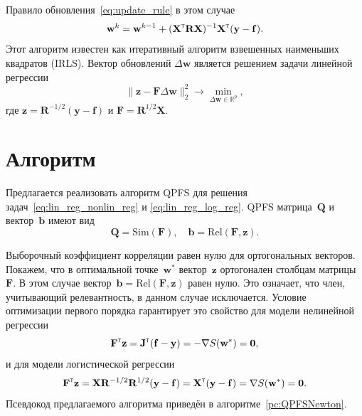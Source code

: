 \documentclass[a4paper,12pt]{article}
\theoremstyle{plain} %
\theoremstyle{definition} %
\theoremstyle{remark} %
\newcommand{\bb}{\mathbf{b}}
\newcommand{\bw}{\mathbf{w}}
\newcommand{\by}{\mathbf{y}}
\newcommand{\bz}{\mathbf{z}}
\newcommand{\bJ}{\mathbf{J}}
\newcommand{\bQ}{\mathbf{Q}}
\newcommand{\bbR}{\mathbb{R}}
\newcommand{\bF}{\mathbf{F}}
\newcommand{\bR}{\mathbf{R}}
\newcommand{\bX}{\mathbf{X}}
\newcommand{\T}{{\text{\tiny\sffamily\upshape\mdseries T}}}
\begin{document}
	Правило обновления~\eqref{eq:update_rule} в этом случае
	\[
	\bw^k = \bw^{k - 1} + (\bX^{\T} \bR \bX)^{-1} \bX^{\T} (\by - \mathbf{f}).
	\]
	Этот алгоритм известен как итеративный алгоритм взвешенных наименьших квадратов (IRLS). Вектор обновлений $\Delta \bw$ является решением задачи линейной регрессии
	\begin{equation}
	\| \bz - \bF \Delta \bw \|_2^2 \rightarrow \min_{\Delta \bw \in \bbR^{p}},
	\label{eq:lin_reg_log_reg}
	\end{equation}
	где $\bz = \bR^{-1/2} (\by - \mathbf{f})$ и $\bF = \bR^{1/2}\bX$.

	\section*{Алгоритм}
	
	Предлагается реализовать алгоритм QPFS для решения задач~\eqref{eq:lin_reg_nonlin_reg} и \eqref{eq:lin_reg_log_reg}. 
	QPFS матрица~$\bQ$ и вектор~$\bb$ имеют вид
	\[
	\bQ = \text{Sim} (\bF), \quad \bb = \text{Rel} (\bF, \bz).
	\]
	
	Выборочный коэффициент корреляции равен нулю для ортогональных векторов.
	Покажем, что в оптимальной точке~$\bw^*$ вектор~$\bz$ ортогонален столбцам матрицы~$\bF$. 
	В этом случае вектор~$\bb = \text{Rel} (\bF, \bz)$ равен нулю. Это означает, что член, учитывающий релевантность, в данном случае исключается.
	Условие оптимизации первого порядка гарантирует это свойство для модели нелинейной регрессии
	\[
	\bF^{\T} \bz = \bJ^{\T} (\mathbf{f} - \by) = - \nabla S(\bw^*) = \boldsymbol{0},
	\]
	и для модели логистической регрессии
	\[
	\bF^{\T} \bz = \bX \bR^{-1/2} \bR^{1/2} (\by - \mathbf{f}) = \bX^{\T} (\by - \mathbf{f}) = \nabla S(\bw^*) = \boldsymbol{0}.
	\]
	Псевдокод предлагаемого алгоритма приведён в алгоритме~\ref{pc:QPFSNewton}.
	
\end{document}
